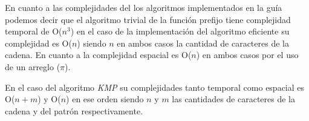 En cuanto a las complejidades del los algoritmos implementados en la guía podemos decir que el algoritmo trivial de la función prefijo tiene complejidad temporal de O($n^3$) en el caso de la implementación del algoritmo eficiente su complejidad es O($n$) siendo $n$ en ambos casos la cantidad de caracteres de la cadena. En cuanto a la complejidad espacial es O($n$) en ambos casos por el uso de un arreglo ($\pi$).

En el caso del algoritmo \emph{KMP} su  complejidades tanto temporal como espacial es O($n+m$) y O($n$) en ese orden siendo $n$ y $m$ las cantidades de caracteres de la cadena y del patrón respectivamente.